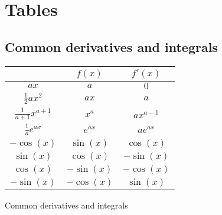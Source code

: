 \section{Tables}

\subsection{Common derivatives and integrals}

\begin{booktable}
  \begin{tabular}{|ccc|}
    \hline
    \rowcolor{headingbg}
    \multicolumn{1}{|c}{\textbf{$\int f(x) \,dx$}} &
      \multicolumn{1}{c}{\textbf{$f(x)$}} &
      \multicolumn{1}{c|}{\textbf{$f'(x)$}} \\
    \hline
    $ax$ & $a$ & $0$ \\
    $\frac{1}{2}ax^2$ & $ax$ & $a$ \\
    $\frac{1}{a + 1}x^{a + 1}$ & $x^a$ & $ax^{a - 1}$ \\
    $\frac{1}{a}e^{ax}$ & $e^{ax}$ & $ae^{ax}$ \\
    $-\cos(x)$ & $\sin(x)$ & $\cos(x)$ \\
    $\sin(x)$ & $\cos(x)$ & $-\sin(x)$ \\
    $\cos(x)$ & $-\sin(x)$ & $-\cos(x)$ \\
    $-\sin(x)$ & $-\cos(x)$ & $\sin(x)$ \\
    \hline
  \end{tabular}
  \caption{Common derivatives and integrals}
  \label{tab:common_derivatives_and_integrals}
\end{booktable}
